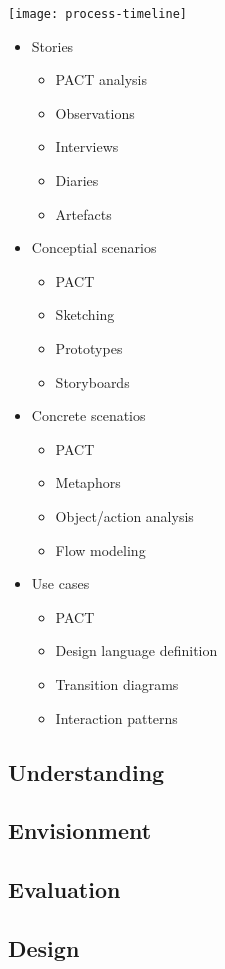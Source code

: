 \texttt{[image: process-timeline]}
\begin{itemize}
	\item Stories
	\begin{itemize}
		\item PACT analysis
		\item Observations
		\item Interviews
		\item Diaries
		\item Artefacts
	\end{itemize}
	\item Conceptial scenarios
	\begin{itemize}
		\item PACT
		\item Sketching
		\item Prototypes
		\item Storyboards
	\end{itemize}
	\item Concrete scenatios
	\begin{itemize}
		\item PACT
		\item Metaphors
		\item Object/action analysis
		\item Flow modeling
	\end{itemize}
	\item Use cases
	\begin{itemize}
		\item PACT
		\item Design language definition
		\item Transition diagrams
		\item Interaction patterns
	\end{itemize}
\end{itemize}
\subsection{Understanding}

\subsection{Envisionment}

\subsection{Evaluation}

\subsection{Design}
